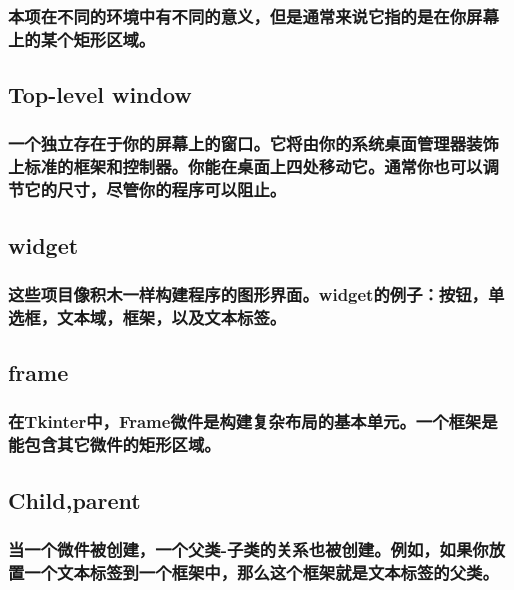 \documentclass[11pt,a4paper,oneside]{book}
\begin{document}
\subsubsection*{本项在不同的环境中有不同的意义，但是通常来说它指的是在你屏幕上的某个矩形区域。}
\subsection*{\textbf{Top-level window}}
\subsubsection*{一个独立存在于你的屏幕上的窗口。它将由你的系统桌面管理器装饰上标准的框架和控制器。你能在桌面上四处移动它。通常你也可以调节它的尺寸，尽管你的程序可以阻止。}
\subsection*{\textbf{widget}}
\subsubsection*{这些项目像积木一样构建程序的图形界面。widget的例子：按钮，单选框，文本域，框架，以及文本标签。}
\subsection*{\textbf{frame}}
\subsubsection*{在Tkinter中，Frame微件是构建复杂布局的基本单元。一个框架是能包含其它微件的矩形区域。}
\subsection*{\textbf{Child,parent}}
\subsubsection*{当一个微件被创建，一个父类-子类的关系也被创建。例如，如果你放置一个文本标签到一个框架中，那么这个框架就是文本标签的父类。}
\end{document}
